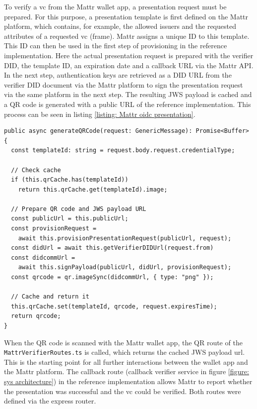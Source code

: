     To verify a \ac{vc} from the Mattr wallet app, a presentation request must be prepared. For this purpose, a presentation template is first defined on the Mattr platform, which contains, for example, the allowed issuers and the requested attributes of a requested \ac{vc} (frame). Mattr assigns a unique ID to this template. This ID can then be used in the first step of provisioning in the reference implementation. Here the actual presentation request is prepared with the verifier \ac{DID}, the template ID, an expiration date and a callback URL via the Mattr API. In the next step, authentication keys are retrieved as a \ac{DID} URL from the verifier \ac{DID} document via the Mattr platform to sign the presentation request via the same platform in the next step. The resulting JWS payload is cached and a QR code is generated with a public URL of the reference implementation. This process can be seen in listing \ref{listing: Mattr oidc presentation}.
    \newline
\begin{lstlisting}[style=ES6, caption=Generate QR code for OIDC presentation reqest, label={listing: Mattr oidc presentation}]
public async generateQRCode(request: GenericMessage): Promise<Buffer> {
  const templateId: string = request.body.request.credentialType;
  
  // Check cache
  if (this.qrCache.has(templateId)) 
    return this.qrCache.get(templateId).image;

  // Prepare QR code and JWS payload URL
  const publicUrl = this.publicUrl;
  const provisionRequest = 
    await this.provisionPresentationRequest(publicUrl, request);
  const didUrl = await this.getVerifierDIDUrl(request.from)
  const didcommUrl = 
    await this.signPayload(publicUrl, didUrl, provisionRequest); 
  const qrcode = qr.imageSync(didcommUrl, { type: "png" });
    
  // Cache and return it
  this.qrCache.set(templateId, qrcode, request.expiresTime);
  return qrcode;
}\end{lstlisting}
    
        When the QR code is scanned with the Mattr wallet app, the QR route of the \texttt{MattrVerifierRoutes.ts} is called, which returns the cached JWS payload url. This is the starting point for all further interactions between the wallet app and the Mattr platform. The callback route (callback verifier service in figure \ref{figure: sys architecture}) in the reference implementation allows Mattr to report whether the presentation was successful and the \ac{vc} could be verified. Both routes were defined via the express router.
        
